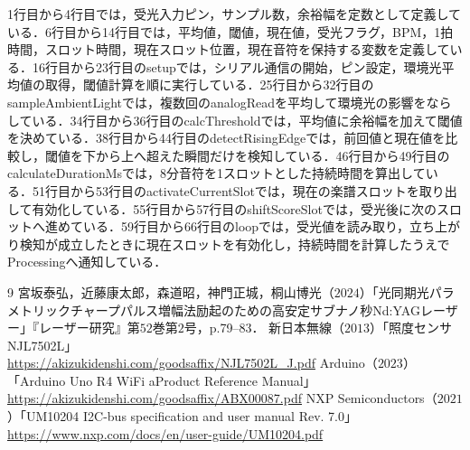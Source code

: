 \documentclass[uplatex,dvipdfmx]{jlreq}
\begin{document}
1行目から4行目では，受光入力ピン，サンプル数，余裕幅を定数として定義している．6行目から14行目では，平均値，閾値，現在値，受光フラグ，BPM，1拍時間，スロット時間，現在スロット位置，現在音符を保持する変数を定義している．16行目から23行目のsetupでは，シリアル通信の開始，ピン設定，環境光平均値の取得，閾値計算を順に実行している．25行目から32行目のsampleAmbientLightでは，複数回のanalogReadを平均して環境光の影響をならしている．34行目から36行目のcalcThresholdでは，平均値に余裕幅を加えて閾値を決めている．38行目から44行目のdetectRisingEdgeでは，前回値と現在値を比較し，閾値を下から上へ超えた瞬間だけを検知している．46行目から49行目のcalculateDurationMsでは，8分音符を1スロットとした持続時間を算出している．51行目から53行目のactivateCurrentSlotでは，現在の楽譜スロットを取り出して有効化している．55行目から57行目のshiftScoreSlotでは，受光後に次のスロットへ進めている．59行目から66行目のloopでは，受光値を読み取り，立ち上がり検知が成立したときに現在スロットを有効化し，持続時間を計算したうえでProcessingへ通知している．


\begin{thebibliography}{9}
 宮坂泰弘，近藤康太郎，森道昭，神門正城，桐山博光（$2024$）「光同期光パラメトリックチャープパルス増幅法励起のための高安定サブナノ秒Nd:YAGレーザー」『レーザー研究』第$52$巻第$2$号，p.79--83．
新日本無線（$2013$）「照度センサNJL7502L」\\
\url{https://akizukidenshi.com/goodsaffix/NJL7502L_J.pdf}
Arduino（$2023$）「Arduino Uno R4 WiFi aProduct Reference Manual」\\
\url{https://akizukidenshi.com/goodsaffix/ABX00087.pdf}
 NXP Semiconductors（$2021$）「UM10204 I2C-bus specification and user manual Rev. 7.0」\\
\url{https://www.nxp.com/docs/en/user-guide/UM10204.pdf}

\end{thebibliography}
\fi
\end{document}
